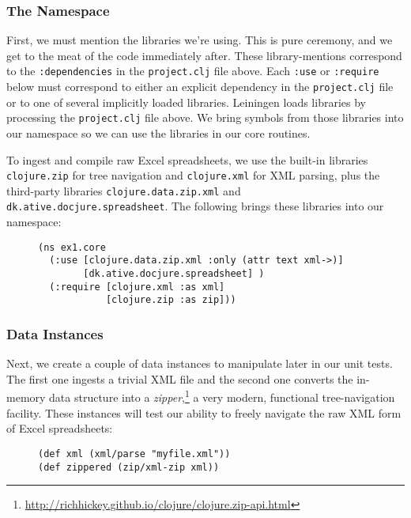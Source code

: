 \documentclass[11pt]{article}
\begin{document}
\subsubsection{The Namespace}
\label{sec-2-3-1}
First, we must mention the libraries we're using. This is pure
ceremony, and we get to the meat of the code immediately after. These
library-mentions correspond to the \verb|:dependencies| in the
\verb|project.clj| file above. Each \verb|:use| or \verb|:require|
below must correspond to either an explicit dependency in the
\verb|project.clj| file or to one of several implicitly loaded
libraries. Leiningen loads libraries by processing the
\verb|project.clj| file above. We bring symbols from those libraries
into our namespace so we can use the libraries in our core routines.

To ingest and compile raw Excel spreadsheets, we use the built-in
libraries \verb|clojure.zip| for tree navigation and
\verb|clojure.xml| for XML parsing, plus the third-party libraries
\verb|clojure.data.zip.xml| and \verb|dk.ative.docjure.spreadsheet|.
The following brings these libraries into our namespace:
\begin{figure}[H]
\label{main-namespace}
\begin{verbatim}
(ns ex1.core
  (:use [clojure.data.zip.xml :only (attr text xml->)]
        [dk.ative.docjure.spreadsheet] ) 
  (:require [clojure.xml :as xml]
            [clojure.zip :as zip]))
\end{verbatim}
\end{figure}
\subsubsection{Data Instances}
\label{sec-2-3-2}
Next, we create a couple of data instances to manipulate later in our
unit tests. The first one ingests a trivial XML file and the second
one converts the in-memory data structure into a
\emph{zipper},\footnote{\url{http://richhickey.github.io/clojure/clojure.zip-api.html}}
a very modern, functional tree-navigation facility. These instances
will test our ability to freely navigate the raw XML form of Excel
spreadsheets:
\begin{figure}[H]
\label{main-zippered}
\begin{verbatim}
(def xml (xml/parse "myfile.xml"))
(def zippered (zip/xml-zip xml))
\end{verbatim}
\end{figure}
\end{document}
